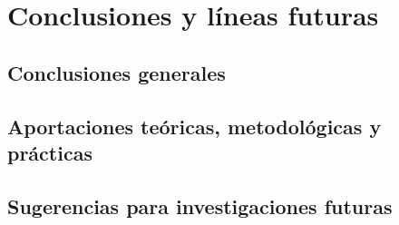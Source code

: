 \chapter{Conclusiones y líneas futuras}
\section{Conclusiones generales}
\section{Aportaciones teóricas, metodológicas y prácticas}
\section{Sugerencias para investigaciones futuras}
